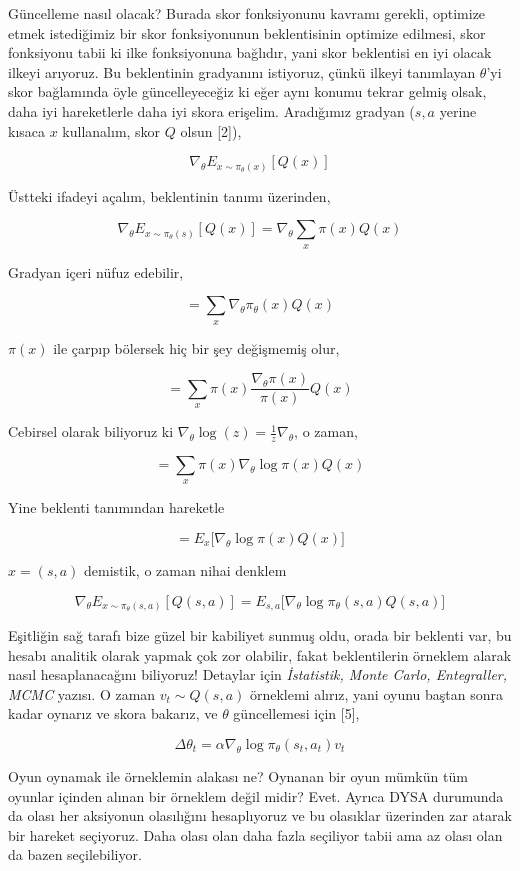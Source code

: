 \documentclass[12pt,fleqn]{article}\usepackage{../../common}
\begin{document}
Güncelleme nasıl olacak? Burada skor fonksiyonunu kavramı gerekli, optimize
etmek istediğimiz bir skor fonksiyonunun beklentisinin optimize edilmesi,
skor fonksiyonu tabii ki ilke fonksiyonuna bağlıdır, yani skor beklentisi
en iyi olacak ilkeyi arıyoruz. Bu beklentinin gradyanını istiyoruz, çünkü
ilkeyi tanımlayan $\theta$'yi skor bağlamında öyle güncelleyeceğiz ki eğer
aynı konumu tekrar gelmiş olsak, daha iyi hareketlerle daha iyi skora
erişelim. Aradığımız gradyan ($s,a$ yerine kısaca $x$ kullanalım, skor $Q$
olsun [2]),

$$ 
\nabla_\theta E_{x \sim \pi_\theta(x)} [Q(x)] 
$$

Üstteki ifadeyi açalım, beklentinin tanımı üzerinden,

$$ \nabla_\theta E_{x \sim \pi_\theta(s)} [Q(x)] = 
\nabla_\theta \sum_x \pi(x) Q(x)
$$

Gradyan içeri nüfuz edebilir,

$$ 
= \sum_x \nabla_\theta \pi_\theta(x) Q(x)
$$

$\pi(x)$ ile çarpıp bölersek hiç bir şey değişmemiş olur,

$$ 
= \sum_x \pi(x) \frac{\nabla_\theta \pi(x)}{\pi(x)} Q(x)
$$

Cebirsel olarak biliyoruz ki $\nabla_\theta \log(z) =
\frac{1}{z}\nabla_\theta$, o zaman,

$$ 
= \sum_x \pi(x) \nabla_\theta \log \pi(x)Q(x)
$$

Yine beklenti tanımından hareketle

$$ 
= E_x \big[ \nabla_\theta \log \pi(x) Q(x) \big]
$$

$x = (s,a)$ demistik, o zaman nihai denklem

$$ 
\nabla_\theta E_{x \sim \pi_\theta(s,a)} [Q(s,a)] 
= E_{s,a} \big[ \nabla_\theta \log \pi_\theta(s,a) Q(s,a) \big]
$$

Eşitliğin sağ tarafı bize güzel bir kabiliyet sunmuş oldu, orada bir
beklenti var, bu hesabı analitik olarak yapmak çok zor olabilir, fakat
beklentilerin örneklem alarak nasıl hesaplanacağını biliyoruz! Detaylar
için {\em İstatistik, Monte Carlo, Entegraller, MCMC} yazısı. O zaman
$v_t \sim Q(s,a)$ örneklemi alırız, yani oyunu baştan sonra kadar oynarız
ve skora bakarız, ve $\theta$ güncellemesi için [5],

$$ \Delta \theta_t = \alpha \nabla_\theta \log \pi_\theta (s_t,a_t) v_t$$

Oyun oynamak ile örneklemin alakası ne? Oynanan bir oyun mümkün tüm oyunlar
içinden alınan bir örneklem değil midir? Evet. Ayrıca DYSA durumunda da
olası her aksiyonun olasılığını hesaplıyoruz ve bu olasıklar üzerinden zar
atarak bir hareket seçiyoruz. Daha olası olan daha fazla seçiliyor tabii
ama az olası olan da bazen seçilebiliyor.
\end{document}
